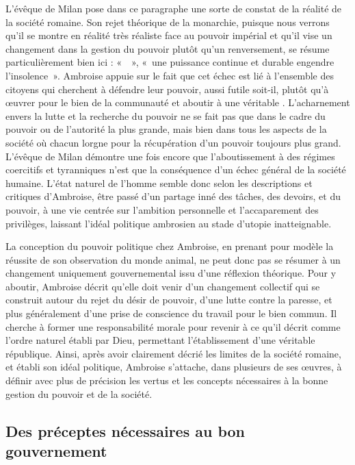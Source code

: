 \bigskip

L'évêque de Milan pose dans ce paragraphe une sorte de constat de la réalité de la société romaine. Son rejet théorique de la monarchie, puisque nous verrons qu'il se montre en réalité très réaliste face au pouvoir impérial et qu'il vise un changement dans la gestion du pouvoir plutôt qu'un renversement, se résume particulièrement bien ici : «~~», «~une puissance continue et durable engendre l'insolence~». Ambroise appuie sur le fait que cet échec est lié à l'ensemble des citoyens qui cherchent à défendre leur pouvoir, aussi futile soit-il, plutôt qu'à œuvrer pour le bien de la communauté et aboutir à une véritable . L'acharnement envers la lutte et la recherche du pouvoir ne se fait pas que dans le cadre du pouvoir ou de l'autorité la plus grande, mais bien dans tous les aspects de la société où chacun lorgne pour la récupération d'un pouvoir toujours plus grand. L'évêque de Milan démontre une fois encore que l'aboutissement à des régimes coercitifs et tyranniques n'est que la conséquence d'un échec général de la société humaine. L'état naturel de l'homme semble donc selon les descriptions et critiques d'Ambroise, être passé d'un partage inné des tâches, des devoirs, et du pouvoir, à une vie centrée sur l'ambition personnelle et l'accaparement des privilèges, laissant l'idéal politique ambrosien au stade d'utopie inatteignable.

\bigskip

La conception du pouvoir politique chez Ambroise, en prenant pour modèle la réussite de son observation du monde animal, ne peut donc pas se résumer à un changement uniquement gouvernemental issu d'une réflexion théorique. Pour y aboutir, Ambroise décrit qu'elle doit venir d'un changement collectif qui se construit autour du rejet du désir de pouvoir, d'une lutte contre la paresse, et plus généralement d'une prise de conscience du travail pour le bien commun. Il cherche à former une responsabilité morale pour revenir à ce qu'il décrit comme l'ordre naturel établi par Dieu, permettant l'établissement d'une véritable république. Ainsi, après avoir clairement décrié les limites de la société romaine, et établi son idéal politique, Ambroise s'attache, dans plusieurs de ses œuvres, à définir avec plus de précision les vertus et les concepts nécessaires à la bonne gestion du pouvoir et de la société.

\bigskip

\subsection{Des préceptes nécessaires au bon gouvernement}

